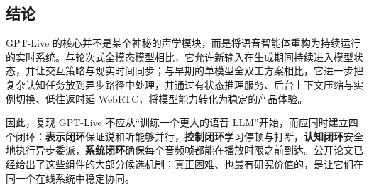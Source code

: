 \subsection{结论}

GPT-Live 的核心并不是某个神秘的声学模块，而是将语音智能体重构为持续运行的实时系统。与轮次式全模态模型相比，它允许新输入在生成期间持续进入模型状态，并让交互策略与现实时间同步；与早期的单模型全双工方案相比，它进一步把复杂认知任务放到异步路径中处理，并通过有状态推理服务、后台上下文压缩与实例切换、低往返时延 WebRTC，将模型能力转化为稳定的产品体验。

因此，复现 GPT-Live 不应从“训练一个更大的语音 LLM”开始，而应同时建立四个闭环：\textbf{表示闭环}保证说和听能够并行，\textbf{控制闭环}学习停顿与打断，\textbf{认知闭环}安全地执行异步委派，\textbf{系统闭环}确保每个音频帧都能在播放时限之前到达。公开论文已经给出了这些组件的大部分候选机制；真正困难、也最有研究价值的，是让它们在同一个在线系统中稳定协同。

